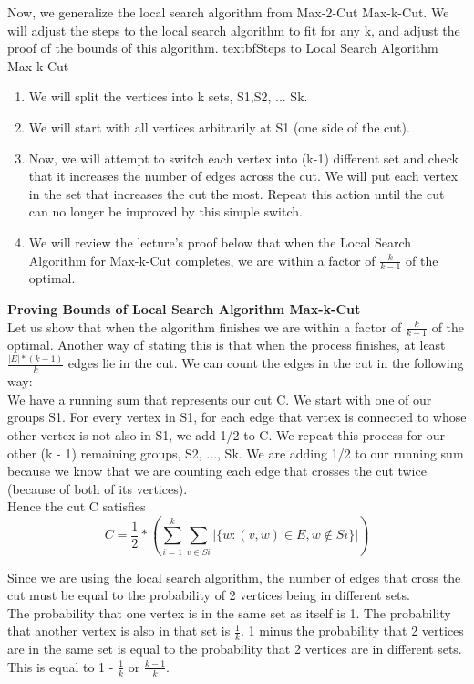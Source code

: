 \documentclass[11pt, solution, letterpaper]{format}
\begin{document}
Now, we generalize the local search algorithm from Max-2-Cut Max-k-Cut. We will adjust the steps to the local search algorithm to fit for any k, and adjust the proof of the bounds of this algorithm. 
textbf{Steps to Local Search Algorithm Max-k-Cut} 
\begin{enumerate}
\item  We will split the vertices into k sets, S1,S2, ... Sk.
\item  We will start with all vertices arbitrarily at S1 (one side of the cut).
\item   Now, we will attempt to switch each vertex into (k-1) different set and check that it increases the number of edges across the cut. We will put each vertex in the set that increases the cut the most. Repeat this action until the cut can no longer be improved by this simple switch.
\item We will review the lecture's proof below that when the Local Search Algorithm for Max-k-Cut completes, we are within a factor of $\frac{k}{k-1}$ of the optimal.
\end{enumerate}

\textbf{Proving Bounds of Local Search Algorithm Max-k-Cut} \\

Let us show that when the algorithm finishes we are within a factor of $\frac{k}{k-1}$ of the optimal. Another way of stating this is that when the process finishes, at least $\frac{|E|*(k-1)}{k}$ edges lie in the cut. We can count the edges in the cut in the following way: \\
We have a running sum that represents our cut C. We start with one of our groups S1. For every vertex in S1, for each edge that vertex is connected to whose other vertex is not also in S1, we add 1/2 to C. We repeat this process for our other (k - 1) remaining groups, S2, ..., Sk. We are adding 1/2 to our running sum because we know that we are counting each edge that crosses the cut twice (because of both of its vertices). \\  

Hence the cut C satisfies
$$C =\frac{1}{2} * (\sum_{i = 1}^{k} \sum_{v\in Si} |\{w: (v, w) \in E, w \not\in Si \}|)$$

Since we are using the local search algorithm, the number of edges that cross the cut must be equal to the probability of 2 vertices being in different sets. \\
The probability that one vertex is in the same set as itself is 1. The probability that another vertex is also in that set is $\frac{1}{k}$. 1 minus the probability that 2 vertices are in the same set is equal to the probability that 2 vertices are in different sets. This is equal to 1 - $\frac{1}{k}$ or $\frac{k - 1}{k}$.
\end{document}

